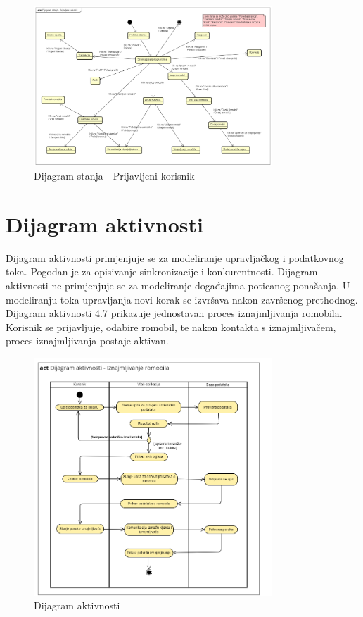 		
			\begin{figure}[H]
				\centering
				\includegraphics[width=0.8\textwidth]{dijagrami/DijagramStanja-PrijavljeniKorisnik.png}
				\caption{Dijagram stanja - Prijavljeni korisnik}
				\label{fig:your_label}
			\end{figure}
			
			
			\eject 
		
		\section{Dijagram aktivnosti}
			
			\indent Dijagram aktivnosti primjenjuje se za modeliranje upravljačkog i podatkovnog toka. Pogodan je za opisivanje sinkronizacije i konkurentnosti. Dijagram aktivnosti ne primjenjuje se za modeliranje događajima poticanog ponašanja. U modeliranju toka upravljanja novi korak se izvršava nakon završenog prethodnog. \\
			
			\indent Dijagram aktivnosti 4.7 prikazuje jednostavan proces iznajmljivanja romobila. 
			Korisnik se prijavljuje, odabire romobil, te nakon kontakta s iznajmljivačem, proces iznajmljivanja postaje aktivan. \\
			
			\begin{figure}[H]
				\centering
				\includegraphics[width=0.8\textwidth]{dijagrami/aktivnost.png}
				\caption{Dijagram aktivnosti}
				\label{fig:your_label}
			\end{figure}
			
